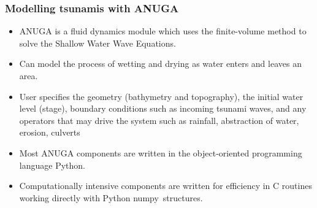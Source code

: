 \documentclass[11pt,ucs]{beamer}
\begin{document}
\begin{frame}\frametitle{Modelling tsunamis with ANUGA}

\begin{itemize}
\item ANUGA is a fluid dynamics module
which uses the finite-volume method to  solve the Shallow Water
Wave Equations.

\item Can model the process of
wetting and drying as water enters and leaves an area.

\item User specifies the geometry
(bathymetry and topography), the initial water level (stage),
boundary conditions such as incoming tsunami waves, and any operators  that may
drive the system such as rainfall, abstraction of water,  erosion, culverts

\item Most ANUGA  components are written in the object-oriented programming
language Python.   

\item Computationally intensive components are written for
efficiency in C routines working directly with Python \mbox{numpy
structures.}

\end{itemize}

\end{frame}
\end{document}
